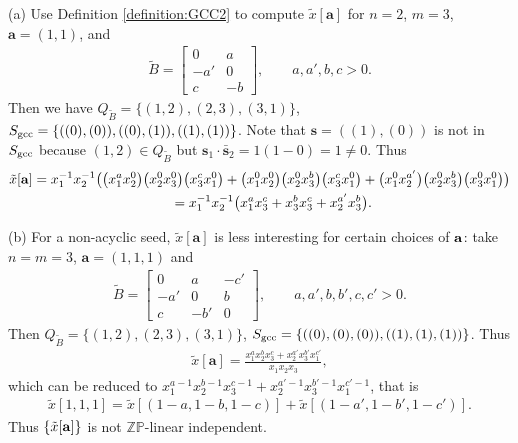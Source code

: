 \documentclass[pdftex]{sigma}
\numberwithin{equation}{section}
\begin{document}
\begin{Example}\label{example}
(a) Use Def\/inition \ref{definition:GCC2} to compute $\tilde{x}[\mathbf{a}]$ for $n=2$, $m=3$, $\mathbf{a}=(1,1)$, and
\begin{gather*}
\tilde{B}=\begin{bmatrix}
0&a\\
-a'&0\\
c&-b
\end{bmatrix},\qquad a,a',b,c>0.
\end{gather*}
Then we have $Q_{\tilde B}=\{(1,2),(2,3),(3,1)\}$, $S_{\rm gcc}=\{((0),(0)), ((0),(1)),  ((1),(1))\}$. Note that $\mathbf{s}=((1),(0))$ is not in $S_{\rm gcc}$ because $(1,2)\in Q_{\tilde B}$ but $\mathbf{s}_1\cdot\bar{\mathbf{s}}_2=1(1-0)=1\neq 0$. Thus
\begin{gather*}
\tilde{x}[\mathbf{a}]
 =x_1^{-1}x_2^{-1}
\big( \big(x_1^ax_2^0\big)\big(x_2^0x_3^0\big)\big(x_3^cx_1^0\big)+
 \big(x_1^0x_2^0\big)\big(x_2^0x_3^b\big)\big(x_3^cx_1^0\big)+
  \big(x_1^0x_2^{a'}\big)\big(x_2^0x_3^b\big)\big(x_3^0x_1^0\big)\big)\\
\hphantom{\tilde{x}[\mathbf{a}]}{}
=x_1^{-1}x_2^{-1}
\big(x_1^ax_3^c+x_3^bx_3^c+x_2^{a'} x_3^b\big).
\end{gather*}

(b) For a non-acyclic seed, $\tilde{x}[\mathbf{a}]$ is less interesting for certain choices of ${\bf a}$: take $n=m=3$, $\mathbf{a}=(1,1,1)$ and
\begin{gather*}
\tilde{B}=\begin{bmatrix}
0&a&-c'\\
-a'&0&b\\
c&-b'&0
\end{bmatrix},\qquad a,a',b,b',c,c'>0.
\end{gather*}
Then $Q_{\tilde B}=\{(1,2),(2,3),(3,1)\}$, $S_{\rm gcc}=\{((0),(0),(0)), ((1),(1),(1))\}$. Thus
\begin{gather*}
\tilde{x}[\mathbf{a}]
=\frac{x_1^ax_2^bx_3^c+x_2^{a'}x_3^{b'}x_1^{c'}}{x_1x_2x_3},
\end{gather*}
which can be reduced to $x_1^{a-1}x_2^{b-1}x_3^{c-1}+x_2^{a'-1}x_3^{b'-1}x_1^{c'-1}$, that is
\begin{gather*}
\tilde{x}[1,1,1]=\tilde{x}[(1-a,1-b,1-c)]+\tilde{x}[(1-a',1-b',1-c')].
\end{gather*}
Thus $\{\tilde{x}[{\bf a}]\}$ is not $\mathbb{ZP}$-linear independent.
\end{Example}
\end{document}

